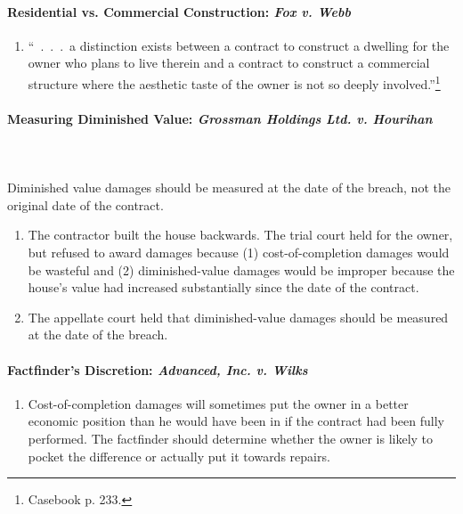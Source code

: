 \paragraph{Residential vs. Commercial Construction: \emph{Fox v. Webb}}

\begin{enumerate}
    \item ``~.~.~.~a distinction exists between a contract to construct a 
    dwelling for the owner who plans to live therein and a contract to 
    construct a commercial structure where the aesthetic taste of the owner is 
    not so deeply involved.''\footnote{Casebook p. 233.}
\end{enumerate}

\paragraph{Measuring Diminished Value: \emph{Grossman Holdings Ltd. v. 
Hourihan}}
~\\\\
Diminished value damages should be measured at the date of the breach, not the 
original date of the contract.

\begin{enumerate}
    \item The contractor built the house backwards. The trial court held for 
    the owner, but refused to award damages because (1) cost-of-completion 
    damages would be wasteful and (2) diminished-value damages would be 
    improper because the house's value had increased substantially since the 
    date of the contract.
    \item The appellate court held that diminished-value damages should be 
    measured at the date of the breach.
\end{enumerate}

\paragraph{Factfinder's Discretion: \emph{Advanced, Inc. v. Wilks}}

\begin{enumerate}
    \item Cost-of-completion damages will sometimes put the owner in a better 
    economic position than he would have been in if the contract had been 
    fully performed. The factfinder should determine whether the owner is 
    likely to pocket the difference or actually put it towards repairs.
\end{enumerate}

